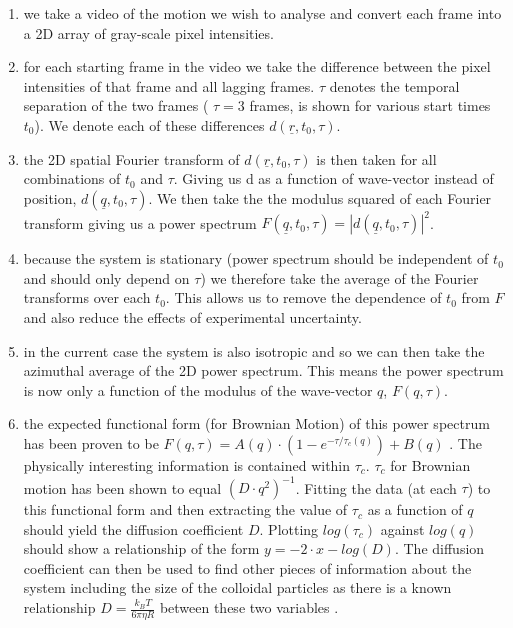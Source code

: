 \documentclass[10pt]{article}
\begin{document}
\begin{enumerate}[label=\alph*]
\item we take a video of the motion we wish to analyse and convert each frame into a 2D array of gray-scale pixel intensities.
\item for each starting frame in the video we take the difference between the pixel intensities of that frame and all lagging frames. $ \tau $ 
denotes the temporal separation of the two frames ( $ \tau = 3 $ frames,  is shown for various start times $ t_0 $). We denote each of these differences $ d(\underline{r}, t_0, \tau) $.
\item the 2D spatial Fourier transform of $ d(\underline{r}, t_0, \tau) $ is then taken for all combinations of $ t_0 $ and $ \tau $. Giving us d as a function of wave-vector instead of position, $ d(\underline{q}, t_0, \tau) $. We then take the the modulus squared of each Fourier transform giving us a power spectrum $F(\underline{q}, t_0, \tau) = |d(\underline{q}, t_0, \tau)|^2$.
\item because the system is stationary (power spectrum should be independent of $t_0$ and should only depend on $\tau$) we therefore take the average of the Fourier transforms over each $t_0$. This allows us to remove the dependence of $t_0$ from $F$ and also reduce the effects of experimental uncertainty.
\item in the current case the system is also isotropic and so we can then take the azimuthal average of the 2D power spectrum. This means the power spectrum is now only a function of the modulus of the wave-vector $q$, $F(q, \tau)$.
\item the expected functional form (for Brownian Motion) of this power spectrum has been proven to be $F(q, \tau) = A(q) \cdot (1 - e^{-\tau / \tau_c (q)}) + B(q)$ \cite{DLSPecora}. The physically interesting information is contained within $\tau_c$. $\tau_c$ for Brownian motion has been shown to equal $(D \cdot q^2)^{-1}$. Fitting the data (at each $\tau$) to this functional form and then extracting the value of $\tau_c$ as a function of $q$ should yield the diffusion coefficient $D$. Plotting $log(\tau_c)$ against $log(q)$ should show a relationship of the form $y = -2\cdot x - log(D)$. The diffusion coefficient can then be used to find other pieces of information about the system including the size of the colloidal particles as there is a known relationship $D=\frac{k_B T}{6 \pi \eta R}$ between these two variables \cite{wynot_2002}.
\end{enumerate}
\end{document}
